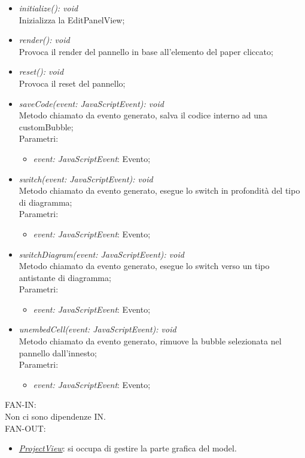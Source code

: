 \documentclass[../DefinizioneDiProdotto.tex]{subfiles}
\begin{document}
\begin{itemize}
\begin{itemize}
\begin{itemize}
							\end{itemize}
							\item \emph{initialize(): void} \\
							Inizializza la EditPanelView; 
							\item \emph{render(): void} \\
							Provoca il render del pannello in base all'elemento del paper cliccato; 
							\item \emph{reset(): void} \\
							Provoca il reset del pannello; 
							\item \emph{saveCode(event: JavaScriptEvent): void} \\
							Metodo chiamato da evento generato, salva il codice interno ad una customBubble; \\
							Parametri:
							\begin{itemize}
								\item \emph{event: JavaScriptEvent}: Evento;
							\end{itemize}
							\item \emph{switch(event: JavaScriptEvent): void} \\
							Metodo chiamato da evento generato, esegue lo switch in profondità del tipo di diagramma; \\
							Parametri:
							\begin{itemize}
								\item \emph{event: JavaScriptEvent}: Evento;
							\end{itemize}
							\item \emph{switchDiagram(event: JavaScriptEvent): void} \\
							Metodo chiamato da evento generato, esegue lo switch verso un tipo antistante di diagramma; \\
							Parametri:
							\begin{itemize}
								\item \emph{event: JavaScriptEvent}: Evento;
							\end{itemize}
							\item \emph{unembedCell(event: JavaScriptEvent): void} \\
							Metodo chiamato da evento generato, rimuove la bubble selezionata nel pannello dall'innesto; \\
							Parametri:
							\begin{itemize}
								\item \emph{event: JavaScriptEvent}: Evento;
							\end{itemize}
						\end{itemize}
						FAN-IN:\\
						Non ci sono dipendenze IN. \\
						FAN-OUT:
						\begin{itemize}
							\item \hyperlink{SWEDesigner::View::ProjectView}{\emph{ProjectView}}: si occupa di gestire la parte grafica del model.
						\end{itemize}
					\end{itemize}
\end{document}
